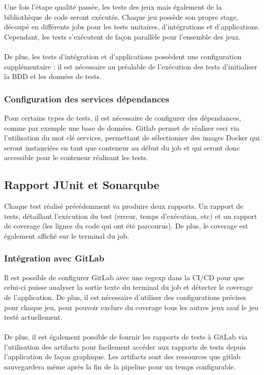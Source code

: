\documentclass{article}
\begin{document}
            Une fois l'étape qualité passée, les tests des jeux mais également de la bibliothèque de code seront exécutés. Chaque jeu possède son propre stage, découpé en différents jobs pour les tests unitaires, d'intégrations et d'applications. Cependant, les tests s'exécutent de façon parallèle pour l'ensemble des jeux.\\
            \\
            \indent De plus, les tests d'intégration et d'applications possèdent une configuration supplémentaire : il est nécessaire au préalable de l'exécution des tests d'initialiser la BDD et les données de tests.

            \subsubsection{Configuration des services dépendances}

                Pour certains types de tests, il est nécessaire de configurer des dépendances, comme par exemple une base de données. Gitlab permet de réaliser ceci via l'utilisation du mot clé services, permettant de sélectionner des images Docker qui seront instanciées en tant que conteneur au début du job et qui seront donc accessible pour le conteneur réalisant les tests.

        \subsection{Rapport JUnit et Sonarqube}

            Chaque test réalisé précédemment va produire deux rapports. Un rapport de tests, détaillant l'exécution du test (erreur, temps d'exécution, etc) et un rapport de coverage (les lignes du code qui ont été parcourus). De plus, le coverage est également affiché sur le terminal du job.\\

            \subsubsection{Intégration avec GitLab}

                Il est possible de configurer GitLab avec une regexp dans la CI/CD pour que celui-ci puisse analyser la sortie texte du terminal du job et détecter le coverage de l'application. De plus, il est nécessaire d'utiliser des configurations précises pour chaque jeu, pour pouvoir exclure du coverage tous les autres jeux sauf le jeu testé actuellement.\\
                \\
                \indent De plus, il est également possible de fournir les rapports de tests à GitLab via l'utilisation des artifacts pour facilement accéder aux rapports de tests depuis l'application de façon graphique. Les artifacts sont des ressources que gitlab sauvegardera même après la fin de la pipeline pour un temps configurable.
\end{document}
